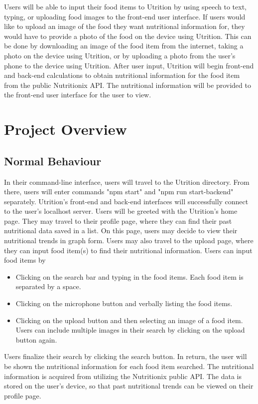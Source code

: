 \documentclass[12pt, titlepage]{article}
\begin{document}
Users will be able to input their food items to Utrition by using speech to text, typing, or uploading food images to the front-end user interface. If users would like to upload an image of the food they want nutritional information for, they would have to provide a photo of the food on the device using Utrition. This can be done by downloading an image of the food item from the internet, taking a photo on the device using Utrition, or by uploading a photo from the user's phone to the device using Utrition. After user input, Utrition will begin front-end and back-end calculations to obtain nutritional information for the food item from the public Nutritionix API. The nutritional information will be provided to the front-end user interface for the user to view.


\section{Project Overview}

\subsection{Normal Behaviour}
In their command-line interface, users will travel to the Utrition directory. From there, users will enter commands "npm start" and "npm run start-backend" separately. Utrition's front-end and back-end interfaces will successfully connect to the user's localhost server. Users will be greeted with the Utrition's home page. They may travel to their profile page, where they can find their past nutritional data saved in a list. On this page, users may decide to view their nutritional trends in graph form. Users may also travel to the upload page, where they can input food item(s) to find their nutritional information. Users can input food items by 
\begin{itemize}
	\item Clicking on the search bar and typing in the food items. Each food item is separated by a space.
	\item Clicking on the microphone button and verbally listing the food items.
	\item Clicking on the upload button and then selecting an image of a food item. Users can include multiple images in their search by clicking on the upload button again.
\end{itemize}
Users finalize their search by clicking the search button. In return, the user will be shown the nutritional information for each food item searched. The nutritional information is acquired from utilizing the Nutritionix public API. The data is stored on the user's device, so that past nutritional trends can be viewed on their profile page.
\end{document}
